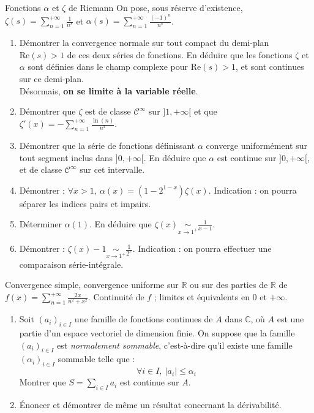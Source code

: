 \documentclass[french,a4paper]{article}
\newcommand{\R}{\mathbb{R}}
\newcommand{\C}{\mathbb{C}}
\theoremstyle{plain}
\theoremstyle{definition}
\theoremstyle{remark}
\begin{document}
\begin{ex}[Châteaux]{Fonctions $\alpha$ et $\zeta$ de Riemann}
	On pose, sous réserve d'existence, $\zeta(s)=\displaystyle\sum_{n=1}^{+\infty}\frac{1}{n^s}$ et $\alpha(s)=\displaystyle\sum_{n=1}^{+\infty}\frac{(-1)^n}{n^s}$.
	\begin{enumerate}
		\item Démontrer la convergence normale sur tout compact du demi-plan $\text{Re}(s)>1$ de ces deux séries de fonctions. En déduire que les fonctions $\zeta$ et $\alpha$ sont définies dans le champ complexe pour $\text{Re}(s)>1$, et sont continues sur ce demi-plan. \\
		Désormais, \textbf{on se limite à la variable réelle}.
		\item Démontrer que $\zeta$ est de classe $\mathcal{C}^\infty$ sur $]1,+\infty[$ et que $\zeta'(x)=\displaystyle-\sum_{n=1}^{+\infty}\frac{\ln(n)}{n^x}$.
		\item Démontrer que la série de fonctions définissant $\alpha$ converge uniformément sur tout segment inclus dans $]0,+\infty[$. En déduire que $\alpha$ est continue sur $]0,+\infty[$, et de classe $\mathcal{C}^\infty$ sur cet intervalle.
		\item Démontrer : $\forall x>1,\ \alpha(x)=(1-2^{1-x})\zeta(x)$. Indication : on pourra séparer les indices pairs et impairs.
		\item Déterminer $\alpha(1)$. En déduire que $\zeta(x)\displaystyle\underset{x\to 1^+}{\sim}\frac{1}{x-1}$.
		\item Démontrer : $\zeta(x)-1\underset{x\to1^+}{\sim}\displaystyle\frac{1}{2^x}$. Indication : on pourra effectuer une comparaison série-intégrale.
	\end{enumerate}
\end{ex}

\begin{ex}{}
	Convergence simple, convergence uniforme sur $\R$ ou sur des parties de $\R$ de $f(x)=\displaystyle\sum_{n=1}^{+\infty}\frac{2x}{n^2+x^2}$. Continuité de $f$ ; limites et équivalents en $0$ et $+\infty$.
\end{ex}

\begin{ex}{}
	\begin{enumerate}
		\item Soit $(a_i)_{i\in I}$ une famille de fonctions continues de $A$ dans $\C$, où $A$ est une partie d'un espace vectoriel de dimension finie. On suppose que la famille $(a_i)_{i\in I}$ est \textit{normalement sommable}, c'est-à-dire qu'il existe une famille $(\alpha_i)_{i\in I}$ sommable telle que : $$\forall i\in I,\ \lvert a_i\rvert\leqslant\alpha_i$$ Montrer que $S=\displaystyle\sum_{i\in I} a_i$ est continue sur $A$.
		\item Énoncer et démontrer de même un résultat concernant la dérivabilité.
	\end{enumerate}
\end{ex}
\end{document}
